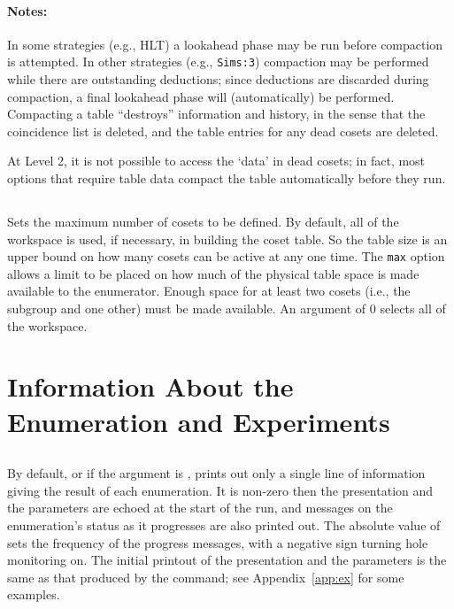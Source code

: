 \paragraph{Notes:}
In some strategies (e.g., HLT) a lookahead phase may be run before
compaction is attempted.  In other strategies (e.g., {\tt Sims:3}) compaction may
be performed while there are outstanding deductions; since deductions are
discarded during compaction, a final lookahead phase will (automatically) be
performed.
%
Compacting a table ``destroys'' information and history, in the sense that
the coincidence list is deleted, and the table entries for any dead cosets
are deleted.

At Level 2, it is not possible to access the `data' in dead cosets; in
  fact, most options that require table data compact the table 
  automatically before they run.

\subsection{}
\label{cmd:max cosets}
Sets the maximum number of cosets to be defined.
By default, all of the workspace is used, if necessary, in building the
coset table.  So the table size is an upper bound on how many cosets can be
active at any one time.  The {\tt max} option allows a limit to be placed on how
much of the physical table space is made available to the enumerator.
Enough space for at least two cosets (i.e., the subgroup and one other) must
be made available.  An argument of 0 selects all of the workspace.

\section{Information About the Enumeration and Experiments}
\label{sec:info}

\subsection{}
\label{cmd:messages}
\label{cmd:monitor}
By default, or if the argument is , {\ace} prints out only a single
  line of information giving the result of each enumeration.
It  is non-zero then the presentation and the parameters are
  echoed at the start of the run, and messages on the enumeration's status
  as it progresses are also printed out.
The absolute value of  sets the frequency of the progress
  messages, with a negative sign turning hole monitoring on.
The initial printout of the presentation and the parameters is the same
  as that produced by the  command; see Appendix~\ref{app:ex}
  for some examples.

